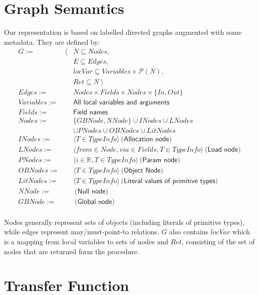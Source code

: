 \section{Graph Semantics}
Our representation is based on labelled directed graphs augmented with some
metadata. They are defined by:
\begin{eqnarray*}
    G           := &\langle& N \subseteq Nodes, \\
                   && E \subseteq Edges, \\
                   && locVar \subseteq Variables \times \mathcal{P}(N), \\
                   && Ret \subseteq N ~ \rangle \\
    Edges       := && Nodes \times Fields \times Nodes \times \{In, Out\} \\
    Variables   := && \textsf{All local variables and arguments} \\
    Fields      := && \textsf{Field names} \\
    Nodes       := && \{ GBNode, NNode \} \cup INodes \cup LNodes \\
                   && \cup PNodes \cup OBNodes \cup LitNodes \\
    INodes      := && \langle T \in TypeInfo \rangle ~ \textsf{(Allocation node)} \\
    LNodes      := && \langle from \in Node, via \in Fields, T \in TypeInfo \rangle ~ \textsf{(Load node)} \\
    PNodes      := && \langle i \in \mathbb{R}, T \in TypeInfo \rangle ~ \textsf{(Param node)} \\
    OBNodes     := && \langle T \in TypeInfo \rangle ~ \textsf{(Object Node)} \\
    LitNodes    := && \langle T \in TypeInfo \rangle ~ \textsf{(Literal values of primitive types)} \\
    NNode       := && ~ \textsf{(Null node)} \\
    GBNode      := && ~ \textsf{(Global node)} \\
\end{eqnarray*}

Nodes generally represent sets of objects (including literals of primitive
types), while edges represent may/must-point-to relations. $G$ also contains
$locVar$ which is a mapping from local variables to sets of nodes and $Ret$,
consisting of the set of nodes that are returned form the procedure.

\section{Transfer Function}
